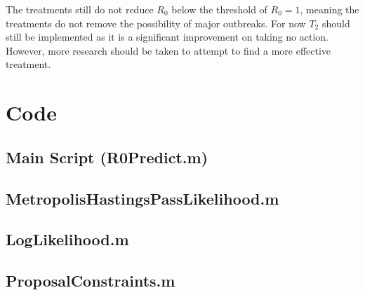 \documentclass{X:/Documents/Coding/Latex/myassignment}
\begin{document}
The treatments still do not reduce $R_0$ below the threshold of $R_0 =1$, meaning the treatments do not remove the possibility of major outbreaks. For now $T_2$ should still be implemented as it is a significant improvement on taking no action. However, more research should be taken to attempt to find a more effective treatment.


\clearpage


\appendix

\printbibliography
\section{Code}
\subsection{Main Script (R0Predict.m)}


\subsection{MetropolisHastingsPassLikelihood.m}

\subsection{LogLikelihood.m}

\subsection{ProposalConstraints.m}




%
\end{document}
